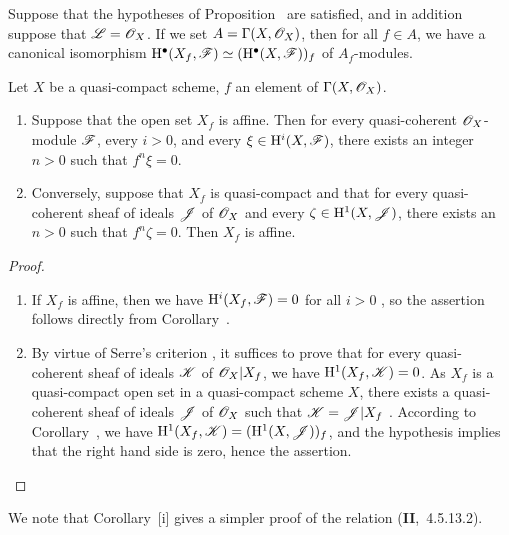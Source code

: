 \begin{cor}[1.4.6]
\label{3.1.4.6}
Suppose that the hypotheses of Proposition~ are satisfied, and in addition suppose that $\mathscr{L}=\mathscr{O}_X$.
If we set $A=\Gamma(X,\mathscr{O}_X)$, then for all $f\in A$, we have a canonical isomorphism $\mathrm{H}^\bullet(X_f,\mathscr{F})\simeq(\mathrm{H}^\bullet(X,\mathscr{F}))_f$ of $A_f$-modules.
\end{cor}

\begin{cor}[1.4.7]
\label{3.1.4.7}
Let $X$ be a quasi-compact scheme, $f$ an element of $\Gamma(X,\mathscr{O}_X)$.
\begin{enumerate}[label=\emph{(\roman*)}]
  \item Suppose that the open set $X_f$ is affine.
    Then for every quasi-coherent $\mathscr{O}_X$-module $\mathscr{F}$, every $i>0$, and every $\xi\in\mathrm{H}^i(X,\mathscr{F})$, there exists an integer $n>0$ such that $f^n\xi=0$.
  \item Conversely, suppose that $X_f$ is quasi-compact and that for every quasi-coherent sheaf of ideals $\mathscr{J}$ of $\mathscr{O}_X$ and every $\zeta\in\mathrm{H}^1(X,\mathscr{J})$, there exists an $n>0$ such that $f^n\zeta=0$.
    Then $X_f$ is affine.
\end{enumerate}
\end{cor}

\begin{proof}
\label{proof-3.1.4.7}
\medskip\noindent
\begin{enumerate}[label=(\roman*)]
  \item If $X_f$ is affine, then we have $\mathrm{H}^i(X_f,\mathscr{F})=0$ for all $i>0$ , so the assertion follows directly from Corollary~.
  \item By virtue of Serre's criterion , it suffices to prove that for every quasi-coherent sheaf of ideals $\mathscr{K}$ of $\mathscr{O}_X|X_f$, we have $\mathrm{H}^1(X_f,\mathscr{K})=0$.
    As $X_f$ is a quasi-compact open set in a quasi-compact scheme $X$, there exists a quasi-coherent sheaf of ideals $\mathscr{J}$ of $\mathscr{O}_X$ such that $\mathscr{K}=\mathscr{J}|X_f$ .
    According to Corollary~, we have $\mathrm{H}^1(X_f,\mathscr{K})=(\mathrm{H}^1(X,\mathscr{J}))_f$, and the hypothesis implies that the right hand side is zero, hence the assertion.
\end{enumerate}
\end{proof}

\begin{rmk}[1.4.8]
\label{3.1.4.8}
We note that Corollary~[i] gives a simpler proof of the relation (\textbf{II},~4.5.13.2).
\end{rmk}

